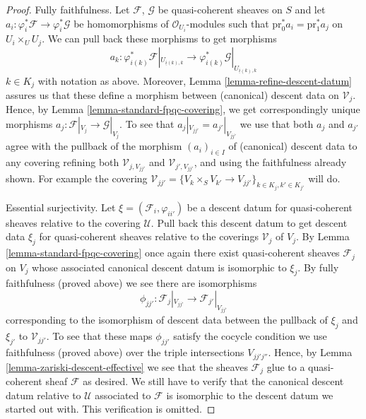 \begin{proof}
\medskip\noindent
Fully faithfulness. Let $\mathcal{F}$, $\mathcal{G}$ be quasi-coherent
sheaves on $S$ and let
$a_i : \varphi_i^*\mathcal{F} \to \varphi_i^*\mathcal{G}$ be
homomorphisms of $\mathcal{O}_{U_i}$-modules such that
$\text{pr}_0^*a_i = \text{pr}_1^*a_j$ on $U_i \times_U U_j$.
We can pull back these morphisms to get morphisms
$$
a_k :
\varphi_{i(k)}^*\mathcal{F}|_{U_{\underline{i}(k), k}}
\longrightarrow
\varphi_{i(k)}^*\mathcal{G}|_{U_{\underline{i}(k), k}}
$$
$k \in K_j$ with notation as above. Moreover,
Lemma \ref{lemma-refine-descent-datum} assures us
that these define a morphism between (canonical) descent data on
$\mathcal{V}_j$. Hence, by
Lemma \ref{lemma-standard-fpqc-covering}, we get correspondingly
unique morphisms $a_j : \mathcal{F}|_{V_j} \to \mathcal{G}|_{V_j}$.
To see that $a_j|_{V_{jj'}} = a_{j'}|_{V_{jj'}}$ we use that
both $a_j$ and $a_{j'}$ agree with the pullback of the morphism
$(a_i)_{i \in I}$ of (canonical) descent data to any covering
refining both $\mathcal{V}_{j, V_{jj'}}$ and
$\mathcal{V}_{j', V_{jj'}}$, and using the faithfulness already
shown. For example the covering
$\mathcal{V}_{jj'} =
\{V_k \times_S V_{k'} \to V_{jj'}\}_{k \in K_j, k' \in K_{j'}}$
will do.

\medskip\noindent
Essential surjectivity. Let $\xi = (\mathcal{F}_i, \varphi_{ii'})$
be a descent datum for quasi-coherent sheaves relative to the covering
$\mathcal{U}$. Pull back this descent datum to get descent data
$\xi_j$ for quasi-coherent sheaves relative to the coverings
$\mathcal{V}_j$ of $V_j$. By Lemma \ref{lemma-standard-fpqc-covering}
once again there exist
quasi-coherent sheaves $\mathcal{F}_j$ on $V_j$ whose associated
canonical descent datum is isomorphic to $\xi_j$. By fully faithfulness
(proved above) we see there are isomorphisms
$$
\phi_{jj'} :
\mathcal{F}_j|_{V_{jj'}}
\longrightarrow
\mathcal{F}_{j'}|_{V_{jj'}}
$$
corresponding to the isomorphism of descent data between the pullback
of $\xi_j$ and $\xi_{j'}$ to $\mathcal{V}_{jj'}$. To see that these
maps $\phi_{jj'}$ satisfy the cocycle condition we use faithfulness
(proved above) over the triple intersections $V_{jj'j''}$. Hence, by
Lemma \ref{lemma-zariski-descent-effective}
we see that the sheaves $\mathcal{F}_j$
glue to a quasi-coherent sheaf $\mathcal{F}$ as desired.
We still have to verify that the canonical descent datum relative to
$\mathcal{U}$ associated to $\mathcal{F}$ is isomorphic to the descent
datum we started out with. This verification is omitted.
\end{proof}









